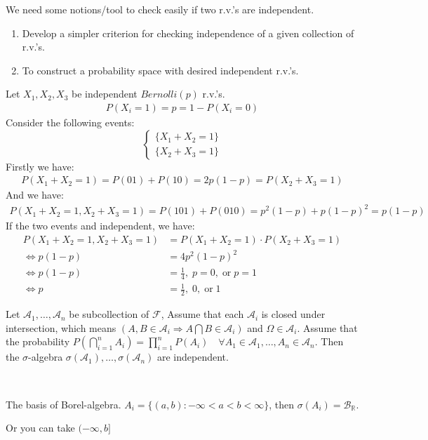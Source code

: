 \documentclass[11pt]{article}
\begin{document}
We need some notions/tool to check easily if two r.v.'s are independent.
\begin{enumerate}
    \item Develop a simpler criterion for checking independence of a given collection of r.v.'s.
    \item To construct a probability space with desired independent r.v.'s.
\end{enumerate}

\begin{example}
    Let $X_1, X_2,X_3$ be independent $Bernolli(p)$ r.v.'s.
    \begin{align*}
        P(X_{i} = 1) = p = 1-P(X_{i} = 0)
    \end{align*}
    Consider the following events:
    \begin{equation*}
        \begin{cases} 
        \{X_1 + X_2 = 1\}\\ 
        \{X_2+X_3 = 1 \}  
        \end{cases}
    \end{equation*}
    Firstly we have:
    \begin{align*}
        P(X_1 + X_2 = 1) = P(01) + P(10) = 2p(1-p) = P(X_2+X_3 = 1)
    \end{align*}
    And we have:
    \begin{align*}
        P(X_1+X_2=1, X_2+X_3=1) = P(101) + P(010) = p^{2}(1-p) + p(1-p)^2 = p(1-p)
    \end{align*}
    If the two events and independent, we have:
    \begin{align*}
        P(X_1+X_2=1, X_2+X_3=1) &= P(X_1 + X_2 = 1) \cdot P(X_2+X_3 = 1)\\
        \iff p(1-p) &= 4p^{2}(1-p)^{2} \\
        \iff p(1-p) &= \frac{1}{4}, \; p =0,\; \text{or} \; p=1 \\
        \iff p &= \frac{1}{2},\; 0,\; \text{or} \; 1
    \end{align*}
\end{example}


\begin{theorem}
    \label{theorem:1.3}
    Let $\mathcal{A}_{1}, \ldots ,\mathcal{A}_{n}$ be subcollection of $\mathcal{F}$,
    Assume that each $\mathcal{A}_{i}$ is closed under intersection, which means 
    $(A,B \in \mathcal{A}_{i} \Longrightarrow A \bigcap B \in \mathcal{A}_{i})$ and $\Omega \in \mathcal{A}_{i}$.
    Assume that the probability $P(\bigcap_{i=1}^{n} A_{i}) = \prod_{i=1}^{n}P(A_i) \quad
    \forall A_1 \in \mathcal{A}_{1}, \ldots ,A_n \in \mathcal{A}_{n}$. Then the $\sigma$-algebra 
    $\sigma(\mathcal{A}_{1}), \ldots ,\sigma(\mathcal{A}_{n})$ are independent.
\end{theorem}
\begin{example}
    \,

    The basis of Borel-algebra.
    $A_i = \{(a,b): -\infty < a < b <\infty\}$, then $\sigma(A_{i}) = \mathcal{B}_{\mathbb{R}}$.

    Or you can take $(-\infty, b]$
\end{example}
\end{document}
